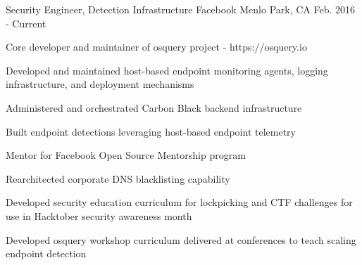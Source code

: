 


\begin{cventries}




\cventry
{Security Engineer, Detection Infrastructure} %
{Facebook} %
{Menlo Park, CA} %
{Feb. 2016 - Current} %
{ %
\begin{cvitems}
\item {Core developer and maintainer of osquery project - https://osquery.io}
\item {Developed and maintained host-based endpoint monitoring agents, logging infrastructure, and deployment mechanisms}
\item {Administered and orchestrated Carbon Black backend infrastructure}
\item {Built endpoint detections leveraging host-based endpoint telemetry}
\item {Mentor for Facebook Open Source Mentorship program}
\item {Rearchitected corporate DNS blacklisting capability}
\item {Developed security education curriculum for lockpicking and CTF challenges for use in Hacktober security awareness month}
\item {Developed osquery workshop curriculum delivered at conferences to teach scaling endpoint detection}
\end{cvitems}
}


\end{cventries}
